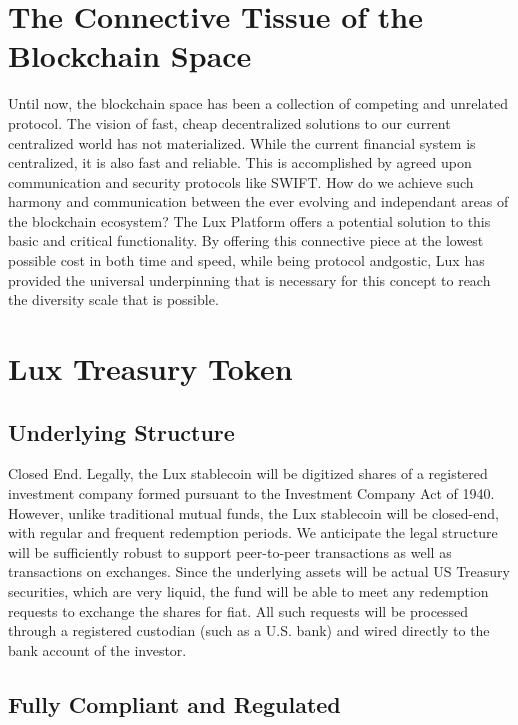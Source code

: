 \documentclass[11pt]{article}
\begin{document}
\section{The Connective Tissue of the Blockchain Space}

Until now, the blockchain space has been a collection of competing and unrelated protocol. The vision of fast, cheap decentralized solutions to our current centralized world has not materialized. While the current financial system is centralized, it is also fast and reliable. This is accomplished by agreed upon communication and security protocols like SWIFT. How do we achieve such harmony and communication between the ever evolving and independant areas of the blockchain ecosystem? The Lux Platform offers a potential solution to this basic and critical functionality. By offering this connective piece at the lowest possible cost in both time and speed, while being protocol andgostic, Lux has provided the universal underpinning that is necessary for this concept to reach the diversity scale that is possible.


\section{Lux Treasury Token}

\subsection{Underlying Structure}

Closed End. Legally, the Lux stablecoin will be digitized shares of a registered investment company formed pursuant to the Investment Company Act of 1940.  However, unlike traditional mutual funds, the Lux stablecoin will be closed-end, with regular and frequent redemption periods.  We anticipate the legal structure will be sufficiently robust to support peer-to-peer transactions as well as transactions on exchanges.  Since the underlying assets will be actual US Treasury securities, which are very liquid, the fund will be able to meet any redemption requests to exchange the shares for fiat.  All such requests will be processed through a registered custodian (such as a U.S. bank) and wired directly to the bank account of the investor.


\subsection{Fully Compliant and Regulated}
\end{document}
